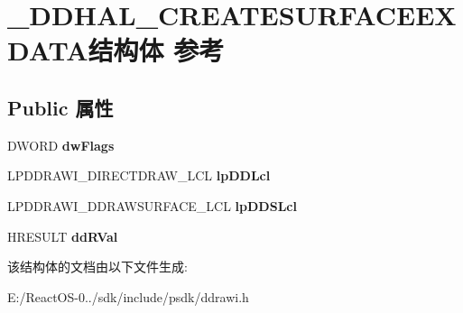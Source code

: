 \hypertarget{struct___d_d_h_a_l___c_r_e_a_t_e_s_u_r_f_a_c_e_e_x_d_a_t_a}{}\section{\+\_\+\+D\+D\+H\+A\+L\+\_\+\+C\+R\+E\+A\+T\+E\+S\+U\+R\+F\+A\+C\+E\+E\+X\+D\+A\+T\+A结构体 参考}
\label{struct___d_d_h_a_l___c_r_e_a_t_e_s_u_r_f_a_c_e_e_x_d_a_t_a}
\subsection*{Public 属性}
\begin{DoxyCompactItemize}
\item 
\mbox{\label{struct___d_d_h_a_l___c_r_e_a_t_e_s_u_r_f_a_c_e_e_x_d_a_t_a_af7feaacce133f52b145f8d99e720bce0}} 
D\+W\+O\+RD {\bfseries dw\+Flags}
\item 
\mbox{\label{struct___d_d_h_a_l___c_r_e_a_t_e_s_u_r_f_a_c_e_e_x_d_a_t_a_a31e0365e27be665e05e7d7721f1cbcca}} 
L\+P\+D\+D\+R\+A\+W\+I\+\_\+\+D\+I\+R\+E\+C\+T\+D\+R\+A\+W\+\_\+\+L\+CL {\bfseries lp\+D\+D\+Lcl}
\item 
\mbox{\label{struct___d_d_h_a_l___c_r_e_a_t_e_s_u_r_f_a_c_e_e_x_d_a_t_a_a90c244e955e3b1e17b95e89674931d5f}} 
L\+P\+D\+D\+R\+A\+W\+I\+\_\+\+D\+D\+R\+A\+W\+S\+U\+R\+F\+A\+C\+E\+\_\+\+L\+CL {\bfseries lp\+D\+D\+S\+Lcl}
\item 
\mbox{\label{struct___d_d_h_a_l___c_r_e_a_t_e_s_u_r_f_a_c_e_e_x_d_a_t_a_a7dfe7a3597cb84b0c517a76cf417a98a}} 
H\+R\+E\+S\+U\+LT {\bfseries dd\+R\+Val}
\end{DoxyCompactItemize}


该结构体的文档由以下文件生成\+:\begin{DoxyCompactItemize}
\item 
E\+:/\+React\+O\+S-\/0../sdk/include/psdk/ddrawi.\+h\end{DoxyCompactItemize}
